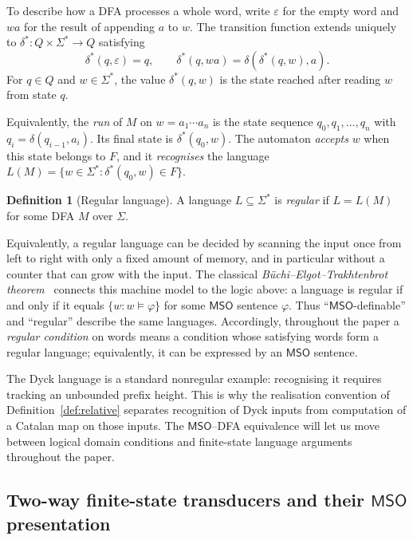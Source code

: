 \documentclass[11pt]{article}
\theoremstyle{definition}
\newtheorem{definition}[theorem]{Definition}
\newcommand{\MSO}{\mathsf{MSO}}
\begin{document}
To describe how a DFA processes a whole word, write $\varepsilon$ for the
empty word and $wa$ for the result of appending $a$ to $w$.  The transition
function extends uniquely to $\delta^*\colon Q\times\Sigma^*\to Q$ satisfying
\[
   \delta^*(q,\varepsilon)=q,
   \qquad
   \delta^*(q,wa)=\delta(\delta^*(q,w),a).
\]
For $q\in Q$ and $w\in\Sigma^*$, the value $\delta^*(q,w)$ is the state reached
after reading $w$ from state $q$.

Equivalently, the \emph{run} of $M$ on $w=a_1\cdots a_n$ is the state sequence
$q_0,q_1,\ldots,q_n$ with $q_i=\delta(q_{i-1},a_i)$.  Its final state is
$\delta^*(q_0,w)$.  The automaton \emph{accepts} $w$ when this state belongs to
$F$, and it \emph{recognises} the language
$L(M)=\{w\in\Sigma^*: \delta^*(q_0,w)\in F\}$.

\begin{definition}[Regular language]\label{def:regular-language}
A language $L\subseteq\Sigma^*$ is \emph{regular} if $L=L(M)$ for some DFA
$M$ over $\Sigma$.
\end{definition}

Equivalently, a regular language can be decided by scanning the input once
from left to right with only a fixed amount of memory, and in particular
without a counter that can grow with the input.  The classical
\emph{B\"uchi--Elgot--Trakhtenbrot
theorem}~\cite{Thomas1997} connects this machine model to the logic above: a
language is regular if and only if it equals
$\{w:w\models\varphi\}$ for some $\MSO$ sentence $\varphi$.  Thus
``$\MSO$-definable'' and ``regular'' describe the same languages.
Accordingly, throughout the paper a \emph{regular condition} on words means a
condition whose satisfying words form a regular language; equivalently, it can
be expressed by an $\MSO$ sentence.

The Dyck language is a standard nonregular example: recognising it requires
tracking an unbounded prefix height.  This is why the realisation convention
of Definition~\ref{def:relative} separates recognition of Dyck inputs from
computation of a Catalan map on those inputs.  The $\MSO$--DFA equivalence will
let us move between logical domain conditions and finite-state language
arguments throughout the paper.

\subsection[Two-way finite-state transducers]{Two-way finite-state transducers and their $\MSO$ presentation}
\label{sec:2dft-mso}
\end{document}
